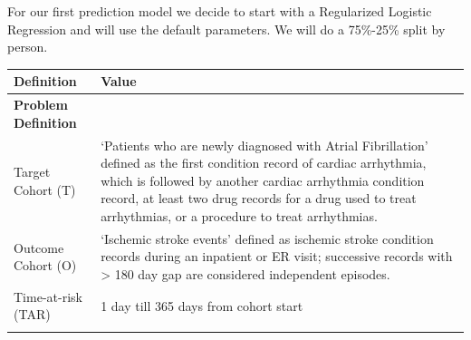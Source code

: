 \documentclass[
]{article}
\begin{document}
For our first prediction model we decide to start with a Regularized
Logistic Regression and will use the default parameters. We will do a
75\%-25\% split by person.

\begin{longtable}[]{@{}ll@{}}
\toprule
\begin{minipage}[b]{0.42\columnwidth}\raggedright
Definition\strut
\end{minipage} & \begin{minipage}[b]{0.52\columnwidth}\raggedright
Value\strut
\end{minipage}\tabularnewline
\midrule
\endhead
\begin{minipage}[t]{0.42\columnwidth}\raggedright
\textbf{Problem Definition}\strut
\end{minipage} & \begin{minipage}[t]{0.52\columnwidth}\raggedright
\strut
\end{minipage}\tabularnewline
\begin{minipage}[t]{0.42\columnwidth}\raggedright
Target Cohort (T)\strut
\end{minipage} & \begin{minipage}[t]{0.52\columnwidth}\raggedright
`Patients who are newly diagnosed with Atrial Fibrillation' defined as
the first condition record of cardiac arrhythmia, which is followed by
another cardiac arrhythmia condition record, at least two drug records
for a drug used to treat arrhythmias, or a procedure to treat
arrhythmias.\strut
\end{minipage}\tabularnewline
\begin{minipage}[t]{0.42\columnwidth}\raggedright
Outcome Cohort (O)\strut
\end{minipage} & \begin{minipage}[t]{0.52\columnwidth}\raggedright
`Ischemic stroke events' defined as ischemic stroke condition records
during an inpatient or ER visit; successive records with \textgreater{}
180 day gap are considered independent episodes.\strut
\end{minipage}\tabularnewline
\begin{minipage}[t]{0.42\columnwidth}\raggedright
Time-at-risk (TAR)\strut
\end{minipage} & \begin{minipage}[t]{0.52\columnwidth}\raggedright
1 day till 365 days from cohort start\strut
\end{minipage}\tabularnewline
\begin{minipage}[t]{0.42\columnwidth}\raggedright

\end{minipage}
\end{longtable}
\end{document}
